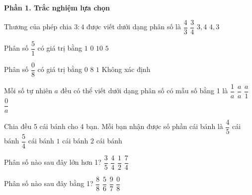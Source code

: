 \textbf{Phần 1. Trắc nghiệm lựa chọn}

\begin{ex} %
Thương của phép chia $3 : 4$ được viết dưới dạng phân số là
\choice
{$\dfrac{4}{3}$}
{\True $\dfrac{3}{4}$}
{$3{,}4$}
{$4{,}3$}
\end{ex}

\begin{ex} %
Phân số $\dfrac{5}{1}$ có giá trị bằng
\choice
{$1$}
{$0$}
{$10$}
{\True $5$}
\end{ex}

\begin{ex} %
Phân số $\dfrac{0}{8}$ có giá trị bằng
\choice
{\True $0$}
{$8$}
{$1$}
{Không xác định}
\end{ex}

\begin{ex} %
Mỗi số tự nhiên $a$ đều có thể viết dưới dạng phân số có mẫu số bằng 1 là
\choice
{$\dfrac{1}{a}$}
{$\dfrac{a}{a}$}
{\True $\dfrac{a}{1}$}
{$\dfrac{0}{a}$}
\end{ex}

\begin{ex} %
Chia đều 5 cái bánh cho 4 bạn. Mỗi bạn nhận được số phần cái bánh là
\choice
{$\dfrac{4}{5}$ cái bánh}
{\True $\dfrac{5}{4}$ cái bánh}
{$1$ cái bánh}
{$2$ cái bánh}
\end{ex}

\begin{ex} %
Phân số nào sau đây lớn hơn 1?
\choice
{$\dfrac{3}{5}$}
{$\dfrac{4}{4}$}
{$\dfrac{1}{2}$}
{\True $\dfrac{7}{4}$}
\end{ex}

\begin{ex} %
Phân số nào sau đây bằng 1?
\choice
{\True $\dfrac{8}{8}$}
{$\dfrac{5}{6}$}
{$\dfrac{9}{7}$}
{$\dfrac{0}{8}$}
\end{ex}

